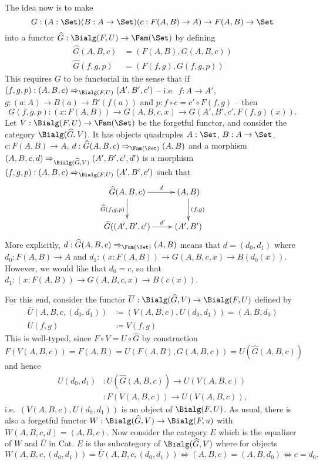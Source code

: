 \documentclass{article}
\begin{document}
The idea now is to make
\[
G : (A : \Set)(B : A \to \Set)(c : F(A,B) \to A) \to F(A,B) \to \Set
\]
into a functor $\widehat{G} : \Bialg(F, U) \to \Fam(\Set)$ by defining
\begin{align*}
\widehat{G}(A, B, c) &= (F(A, B), G(A, B, c)) \\
\widehat{G}(f,g, p) &= (F(f,g), G(f,g, p))
\end{align*}
This requires $G$ to be functorial in the sense that if $(f, g, p) : (A, B, c) \Rightarrow_{\Bialg(F, U)} (A', B', c')$ -- i.e.\ $f : A \to A'$, $g : (a : A) \to B(a) \to B'(f(a))$ and $p : f \circ c = c' \circ F(f,g)$ -- then
\[
G(f,g,p) : (x : F(A, B)) \to G(A, B, c, x) \to G(A', B', c', F(f,g)(x)).
\]
Let $V : \Bialg(F, U) \to \Fam(\Set)$ be the forgetful functor, and
consider the category $\Bialg(\widehat{G}, V)$. It has objects
quadruples $A : \Set$, $B : A \to \Set$, $c : F(A, B) \to A$, $d :
\widehat{G}(A, B, c) \Rightarrow_{\Fam(\Set)} (A, B)$ and a
morphism $(A, B, c, d) \Rightarrow_{\Bialg(\widehat{G}, V)} (A', B',
c', d')$ is a morphism $(f, g, p) : (A, B, c) \Rightarrow_{\Bialg(F, U)} (A', B', c')$ such that
\[
\xymatrix{
\widehat{G}(A, B, c) \ar^-{d}[r] \ar_-{\widehat{G}(f,g, p)}[d] & (A, B) \ar^-{(f, g)}[d] \\
\widehat{G}((A',B', c') \ar^-{d'}[r] & (A',B') \\
}
\]
More explicitly, $d : \widehat{G}(A, B, c) \Rightarrow_{\Fam(\Set)}
(A, B)$ means that $d = (d_0, d_1)$ where $d_0 : F(A, B) \to A$ and
$d_1 : (x : F(A, B)) \to G(A, B, c, x) \to B(d_0(x))$. However, we would
like that $d_0 = c$, so that $d_1 : (x : F(A, B)) \to G(A, B, c, x) \to
B(c(x))$.

For this end, consider the functor $\overline{U} :
\Bialg(\widehat{G}, V) \to \Bialg(F, U)$ defined by
\begin{align*}
  \overline{U}(A, B, c, (d_0, d_1)) &\coloneqq (V(A, B, c), U(d_0, d_1)) = (A, B, d_0) \\
  \overline{U}(f, g) &\coloneqq V(f, g) %
\end{align*}
This is well-typed, since $F \circ V = U \circ \widehat{G}$ by construction
\[
F(V(A, B, c)) = F(A, B) = U(F(A, B), G(A, B, c)) = U(\widehat{G}(A, B, c))
\]
and hence
\begin{align*}
U(d_0, d_1) &: U(\widehat{G}(A, B, c)) \to U(V(A, B, c)) \\
            &: F(V(A, B, c)) \to U(V(A, B, c)),
\end{align*}
i.e.\ $(V(A, B, c), U(d_0, d_1))$ is an object of $\Bialg(F, U)$.  As
usual, there is also a forgetful functor $W : \Bialg(\widehat{G}, V)
\to \Bialg(F, u)$ with $W(A, B, c, d) = (A, B, c)$. Now consider the
category $E$ which is the equalizer of $W$ and $\overline{U}$ in
Cat. $E$ is the subcategory of $\Bialg(\widehat{G}, V)$ where for objects
\[
W(A, B, c, (d_0, d_1)) = \overline{U}(A, B, c, (d_0, d_1)) \Leftrightarrow
(A, B, c) = (A, B, d_0) \Leftrightarrow
c = d_0.
\]
\end{document}
